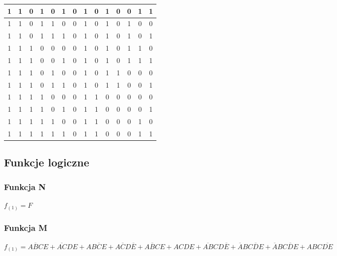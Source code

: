 \documentclass[a4paper]{article}
\begin{document}
\begin{center}
\begin{tabular}{|c|c|c|c|c|c||c|c|c|c|c|c|c|c|}
  \hline 1 & 1 & 0 & 1 & 0 & 1 & 0   &  	1 &	0 &	1 &	0 &	0	& 1	& 1 \\
  \hline 1 & 1 & 0 & 1 & 1 & 0 & 0   &  	1 &	0 &	1 &	0 &	1	& 0	& 0 \\
  \hline 1 & 1 & 0 & 1 & 1 & 1 & 0   &  	1 &	0 &	1 &	0 &	1	& 0	& 1 \\
  \hline 1 & 1 & 1 & 0 & 0 & 0 & 0   &  	1 &	0 &	1 &	0 &	1	& 1	& 0 \\
  \hline 1 & 1 & 1 & 0 & 0 & 1 & 0   &  	1 &	0 &	1 &	0 &	1	& 1	& 1 \\
  \hline 1 & 1 & 1 & 0 & 1 & 0 & 0   &  	1 &	0 &	1 &	1 &	0	& 0	& 0 \\
  \hline 1 & 1 & 1 & 0 & 1 & 1 & 0   &  	1 &	0 &	1 &	1 &	0	& 0	& 1 \\
  \hline 1 & 1 & 1 & 1 & 0 & 0 & 0   &  	1 &	1 &	0 &	0 &	0	& 0	& 0 \\
  \hline 1 & 1 & 1 & 1 & 0 & 1 & 0   &  	1 &	1 &	0 &	0 &	0	& 0	& 1 \\
  \hline 1 & 1 & 1 & 1 & 1 & 0 & 0   &  	1 &	1 &	0 &	0 &	0	& 1	& 0 \\
  \hline 1 & 1 & 1 & 1 & 1 & 1 & 0   &  	1 &	1 &	0 &	0 &	0	& 1	& 1 \\
  \hline 
  \end{tabular}
\end{center} 


\subsection{Funkcje logiczne}
\subsubsection{Funkcja N}
\begin{center}
  $f_{(1)} = F $
\end{center}

\subsubsection{Funkcja M}
\begin{center}
  $f_{(1)} = 
    {\overline{ABC}E} +
    {\overline{AC}DE} + 
    {A\overline{BCE}} +
    {A\overline{C}D\overline{E}} +
    {A\overline{B}CE} +
    {ACDE}+
    {\overline{AB}CD\overline{E}} +
    {\overline{A}B\overline{CDE}} +
    {\overline{A}BC\overline{D}E} +
    {ABC\overline{DE}} $
\end{center}
\end{document}
